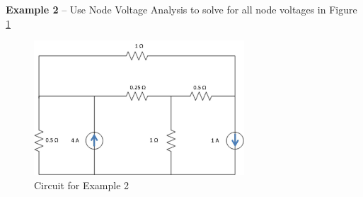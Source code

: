 \documentclass{handout}
\begin{document}
\newpage
\pagebreak
\clearpage

\textbf{Example 2} -- Use Node Voltage Analysis to solve for all node voltages in Figure \ref{fig: NodalAnalysisEx2}
\begin{figure} [h t b]
\centering
\includegraphics[width=0.7\textwidth]{NodalAnalysisEx2.jpg}
\caption{Circuit for Example 2}
\label{fig: NodalAnalysisEx2}
\end{figure}
\end{document}
